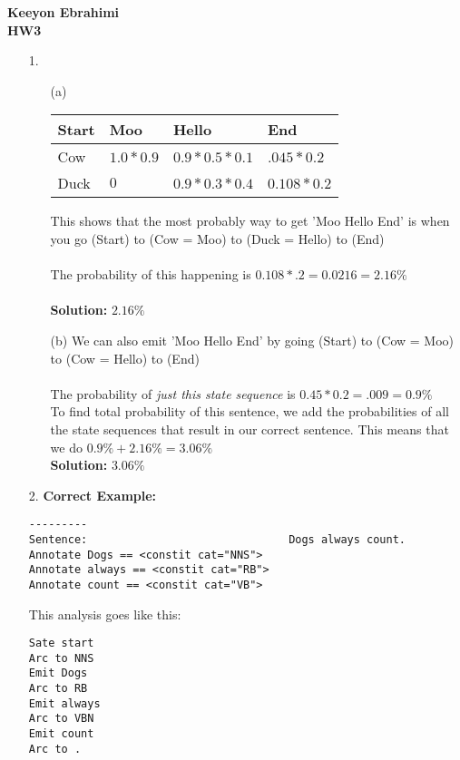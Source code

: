 \documentclass{article}
\begin{document}
\textbf{Keeyon Ebrahimi}\\
\textbf{HW3}

\begin{itemize}
\item[1.]

\begin{itemize}	
\item[(a)] 
\begin{center}
\begin{tabular}{| l | l | l | l | }
\hline
Start & Moo & Hello & End \\ \hline
Cow & $1.0 * 0.9$ & $0.9 * 0.5 * 0.1 $ & $.045 * 0.2 $ \\ \hline
Duck & $0$ & $0.9 * 0.3 * 0.4$ & $0.108 * 0.2$ \\ \hline
\end{tabular}

\end{center}

This shows that the most probably way to get 'Moo Hello End' is when you go (Start) to (Cow = Moo) to (Duck = Hello) to (End)
\\ \\
The probability of this happening is $0.108 * .2 = 0.0216 = 2.16\%$   \\ \\ 
\textbf{Solution: }$ 2.16\% $

\item[(b) ] We can also emit 'Moo Hello End' by going (Start) to (Cow = Moo) to (Cow = Hello)  to (End)
\\ \\
The probability of \textit{just this state sequence } is $0.45 * 0.2 = .009 = 0.9 \%$\\
To find total probability of this sentence, we add the probabilities of all the state sequences that result in our correct sentence.  This means that we do $0.9\% + 2.16\% = 3.06\%$
\\
\textbf{Solution: } $3.06\%$
\end{itemize}

\item[2. ]
\textbf{Correct Example: }
\begin{verbatim}
---------
Sentence:                               Dogs always count.
Annotate Dogs == <constit cat="NNS">
Annotate always == <constit cat="RB">
Annotate count == <constit cat="VB">

\end{verbatim}
This analysis goes like this: 
\begin{verbatim}
Sate start 
Arc to NNS
Emit Dogs
Arc to RB
Emit always
Arc to VBN
Emit count
Arc to .



\end{verbatim}
\end{itemize}
\end{document}
